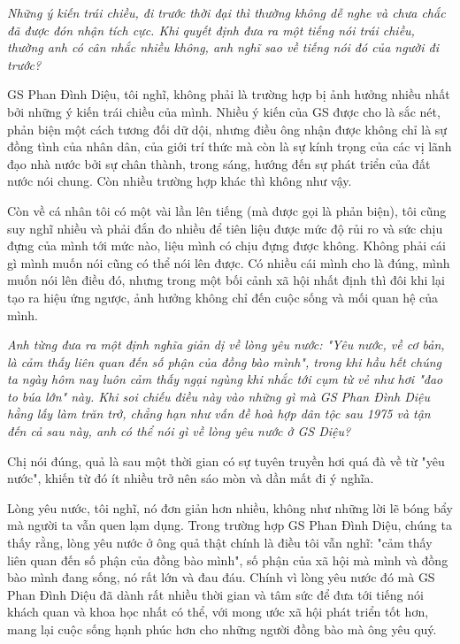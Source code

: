 \emph{Những ý kiến trái chiều, đi trước thời đại thì thường không dễ nghe và chưa chắc đã được đón nhận tích cực. Khi quyết định đưa ra một tiếng nói trái chiều, thường anh có cân nhắc nhiều không, anh nghĩ sao về tiếng nói đó của người đi trước?}

GS Phan Đình Diệu, tôi nghĩ, không phải là trường hợp bị ảnh hưởng nhiều nhất bởi những ý kiến trái chiều của mình. Nhiều ý kiến của GS được cho là sắc nét, phản biện một cách tương đối dữ dội, nhưng điều ông nhận được không chỉ là sự đồng tình của nhân dân, của giới trí thức mà còn là sự kính trọng của các vị lãnh đạo nhà nước bởi sự chân thành, trong sáng, hướng đến sự phát triển của đất nước nói chung. Còn nhiều trường hợp khác thì không như vậy. 

Còn về cá nhân tôi có một vài lần lên tiếng (mà được gọi là phản biện), tôi cũng suy nghĩ nhiều và phải đắn đo nhiều để tiên liệu được mức độ rủi ro và sức chịu đựng của mình tới mức nào, liệu mình có chịu đựng được không. Không phải cái gì mình muốn nói cũng có thể nói lên được. Có nhiều cái mình cho là đúng, mình muốn nói lên điều đó, nhưng trong một bối cảnh xã hội nhất định thì đôi khi lại tạo ra hiệu ứng ngược, ảnh hưởng không chỉ đến cuộc sống và mối quan hệ của mình.

\emph{
Anh từng đưa ra một định nghĩa giản dị về lòng yêu nước: "Yêu nước, về cơ bản, là cảm thấy liên quan đến số phận của đồng bào mình", trong khi hầu hết chúng ta ngày hôm nay luôn cảm thấy ngại ngùng khi nhắc tới cụm từ vẻ như hơi "đao to búa lớn" này. Khi soi chiếu điều này vào những gì mà GS Phan Đình Diệu hằng lấy làm trăn trở, chẳng hạn như vấn đề hoà hợp dân tộc sau 1975 và tận đến cả sau này, anh có thể nói gì về lòng yêu nước ở GS Diệu?}

Chị nói đúng, quả là sau một thời gian có sự tuyên truyền hơi quá đà về từ "yêu nước", khiến từ đó ít nhiều trở nên sáo mòn và dần mất đi ý nghĩa.

Lòng yêu nước, tôi nghĩ, nó đơn giản hơn nhiều, không như những lời lẽ bóng bẩy mà người ta vẫn quen lạm dụng. Trong trường hợp GS Phan Đình Diệu, chúng ta thấy rằng, lòng yêu nước ở ông quả thật chính là điều tôi vẫn nghĩ: "cảm thấy liên quan đến số phận của đồng bào mình", số phận của xã hội mà mình và đồng bào mình đang sống, nó rất lớn và đau đáu. Chính vì lòng yêu nước đó mà GS Phan Đình Diệu đã dành rất nhiều thời gian và tâm sức để đưa tới tiếng nói khách quan và khoa học nhất có thể, với mong ước xã hội phát triển tốt hơn, mang lại cuộc sống hạnh phúc hơn cho những người đồng bào mà ông yêu quý.

